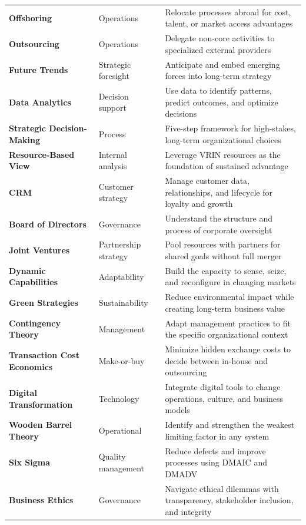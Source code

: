 \documentclass[11pt, letterpaper]{article}
\begin{document}
\begin{center}
\begin{tabular}{>{\bfseries}p{3.8cm} p{3cm} p{6.5cm}}
\addlinespace
Offshoring & Operations & Relocate processes abroad for cost, talent, or market access advantages \\
\addlinespace
Outsourcing & Operations & Delegate non-core activities to specialized external providers \\
\addlinespace
Future Trends & Strategic foresight & Anticipate and embed emerging forces into long-term strategy \\
\addlinespace
Data Analytics & Decision support & Use data to identify patterns, predict outcomes, and optimize decisions \\
\addlinespace
Strategic Decision-Making & Process & Five-step framework for high-stakes, long-term organizational choices \\
\addlinespace
Resource-Based View & Internal analysis & Leverage VRIN resources as the foundation of sustained advantage \\
\addlinespace
CRM & Customer strategy & Manage customer data, relationships, and lifecycle for loyalty and growth \\
\addlinespace
Board of Directors & Governance & Understand the structure and process of corporate oversight \\
\addlinespace
Joint Ventures & Partnership strategy & Pool resources with partners for shared goals without full merger \\
\addlinespace
Dynamic Capabilities & Adaptability & Build the capacity to sense, seize, and reconfigure in changing markets \\
\addlinespace
Green Strategies & Sustainability & Reduce environmental impact while creating long-term business value \\
\addlinespace
Contingency Theory & Management & Adapt management practices to fit the specific organizational context \\
\addlinespace
Transaction Cost Economics & Make-or-buy & Minimize hidden exchange costs to decide between in-house and outsourcing \\
\addlinespace
Digital Transformation & Technology & Integrate digital tools to change operations, culture, and business models \\
\addlinespace
Wooden Barrel Theory & Operational & Identify and strengthen the weakest limiting factor in any system \\
\addlinespace
Six Sigma & Quality management & Reduce defects and improve processes using DMAIC and DMADV \\
\addlinespace
Business Ethics & Governance & Navigate ethical dilemmas with transparency, stakeholder inclusion, and integrity \\

\end{tabular}
\end{center}
\end{document}
